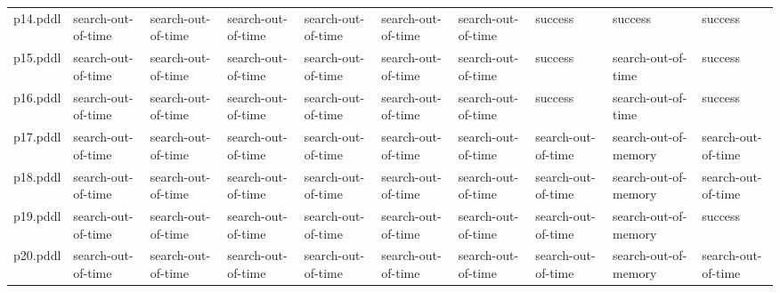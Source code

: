\documentclass{article}
\begin{document}
\begin{tabular}{@{}lrrrrrrrrr@{}}
p14.pddl & \multicolumn{1}{|l|}{search-out-of-time} & \multicolumn{1}{|l|}{search-out-of-time} & \multicolumn{1}{|l|}{search-out-of-time} & \multicolumn{1}{|l|}{search-out-of-time} & \multicolumn{1}{|l|}{search-out-of-time} & \multicolumn{1}{|l|}{search-out-of-time} & \multicolumn{1}{|l|}{success} & \multicolumn{1}{|l|}{success} & \multicolumn{1}{|l|}{success} \\
p15.pddl & \multicolumn{1}{|l|}{search-out-of-time} & \multicolumn{1}{|l|}{search-out-of-time} & \multicolumn{1}{|l|}{search-out-of-time} & \multicolumn{1}{|l|}{search-out-of-time} & \multicolumn{1}{|l|}{search-out-of-time} & \multicolumn{1}{|l|}{search-out-of-time} & \multicolumn{1}{|l|}{success} & \multicolumn{1}{|l|}{search-out-of-time} & \multicolumn{1}{|l|}{success} \\
p16.pddl & \multicolumn{1}{|l|}{search-out-of-time} & \multicolumn{1}{|l|}{search-out-of-time} & \multicolumn{1}{|l|}{search-out-of-time} & \multicolumn{1}{|l|}{search-out-of-time} & \multicolumn{1}{|l|}{search-out-of-time} & \multicolumn{1}{|l|}{search-out-of-time} & \multicolumn{1}{|l|}{success} & \multicolumn{1}{|l|}{search-out-of-time} & \multicolumn{1}{|l|}{success} \\
p17.pddl & \multicolumn{1}{|l|}{search-out-of-time} & \multicolumn{1}{|l|}{search-out-of-time} & \multicolumn{1}{|l|}{search-out-of-time} & \multicolumn{1}{|l|}{search-out-of-time} & \multicolumn{1}{|l|}{search-out-of-time} & \multicolumn{1}{|l|}{search-out-of-time} & \multicolumn{1}{|l|}{search-out-of-time} & \multicolumn{1}{|l|}{search-out-of-memory} & \multicolumn{1}{|l|}{search-out-of-time} \\
p18.pddl & \multicolumn{1}{|l|}{search-out-of-time} & \multicolumn{1}{|l|}{search-out-of-time} & \multicolumn{1}{|l|}{search-out-of-time} & \multicolumn{1}{|l|}{search-out-of-time} & \multicolumn{1}{|l|}{search-out-of-time} & \multicolumn{1}{|l|}{search-out-of-time} & \multicolumn{1}{|l|}{search-out-of-time} & \multicolumn{1}{|l|}{search-out-of-memory} & \multicolumn{1}{|l|}{search-out-of-time} \\
p19.pddl & \multicolumn{1}{|l|}{search-out-of-time} & \multicolumn{1}{|l|}{search-out-of-time} & \multicolumn{1}{|l|}{search-out-of-time} & \multicolumn{1}{|l|}{search-out-of-time} & \multicolumn{1}{|l|}{search-out-of-time} & \multicolumn{1}{|l|}{search-out-of-time} & \multicolumn{1}{|l|}{search-out-of-time} & \multicolumn{1}{|l|}{search-out-of-memory} & \multicolumn{1}{|l|}{success} \\
p20.pddl & \multicolumn{1}{|l|}{search-out-of-time} & \multicolumn{1}{|l|}{search-out-of-time} & \multicolumn{1}{|l|}{search-out-of-time} & \multicolumn{1}{|l|}{search-out-of-time} & \multicolumn{1}{|l|}{search-out-of-time} & \multicolumn{1}{|l|}{search-out-of-time} & \multicolumn{1}{|l|}{search-out-of-time} & \multicolumn{1}{|l|}{search-out-of-memory} & \multicolumn{1}{|l|}{search-out-of-time} \\
\end{tabular}
\end{document}
